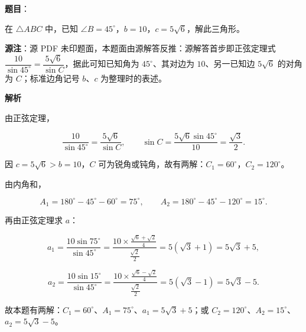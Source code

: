 \begin{answer}

\textbf{题目}：

在 $\triangle ABC$ 中，已知 $\angle B=45^\circ$，$b=10$，$c=5\sqrt6$，解此三角形。

\begin{gktip}
\textbf{源注}：源 PDF 未印题面，本题面由源解答反推：源解答首步即正弦定理式 $\dfrac{10}{\sin45^\circ}=\dfrac{5\sqrt6}{\sin C}$，据此可知已知角为 $45^\circ$、其对边为 $10$、另一已知边 $5\sqrt6$ 的对角为 $C$；标准边角记号 $b$、$c$ 为整理时的表述。
\end{gktip}

\textbf{解析}

由正弦定理，

\nopagebreak[4]
\[
\frac{10}{\sin45^\circ}=\frac{5\sqrt6}{\sin C},
\qquad
\sin C=\frac{5\sqrt6\sin45^\circ}{10}=\frac{\sqrt3}{2}.
\]

因 $c=5\sqrt6>b=10$，$C$ 可为锐角或钝角，故有两解：$C_1=60^\circ$，$C_2=120^\circ$。

由内角和，

\nopagebreak[4]
\[
A_1=180^\circ-45^\circ-60^\circ=75^\circ,
\qquad
A_2=180^\circ-45^\circ-120^\circ=15^\circ.
\]

再由正弦定理求 $a$：

\nopagebreak[4]
\[
a_1=\frac{10\sin75^\circ}{\sin45^\circ}
=\frac{10\times\frac{\sqrt6+\sqrt2}{4}}{\frac{\sqrt2}{2}}
=5(\sqrt3+1)=5\sqrt3+5,
\]

\nopagebreak[4]
\[
a_2=\frac{10\sin15^\circ}{\sin45^\circ}
=\frac{10\times\frac{\sqrt6-\sqrt2}{4}}{\frac{\sqrt2}{2}}
=5(\sqrt3-1)=5\sqrt3-5.
\]

故本题有两解：$C_1=60^\circ$、$A_1=75^\circ$、$a_1=5\sqrt3+5$；或 $C_2=120^\circ$、$A_2=15^\circ$、$a_2=5\sqrt3-5$。


\end{answer}
